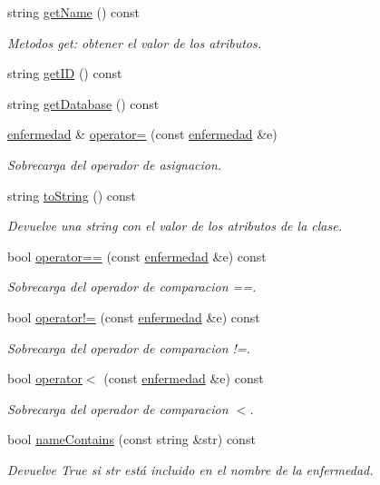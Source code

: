 \begin{DoxyCompactItemize}
\item 
string \hyperlink{classenfermedad_ab22f6f0140a5fe5a331d72920d95f55b}{get\-Name} () const 
\begin{DoxyCompactList}\small\item\em Metodos get\-: obtener el valor de los atributos. \end{DoxyCompactList}\item 
string \hyperlink{classenfermedad_aaf9b9135b1d4efda7dc61856fce1b7b2}{get\-I\-D} () const 
\item 
string \hyperlink{classenfermedad_a79d304a2e39ea391917744fd4d8f168d}{get\-Database} () const 
\item 
\hyperlink{classenfermedad}{enfermedad} \& \hyperlink{classenfermedad_a795be16b7e3e6a858211ff20a62c9d85}{operator=} (const \hyperlink{classenfermedad}{enfermedad} \&e)
\begin{DoxyCompactList}\small\item\em Sobrecarga del operador de asignacion. \end{DoxyCompactList}\item 
string \hyperlink{classenfermedad_a044425928b4f7fa6a398cf2486260b23}{to\-String} () const 
\begin{DoxyCompactList}\small\item\em Devuelve una string con el valor de los atributos de la clase. \end{DoxyCompactList}\item 
bool \hyperlink{classenfermedad_ac2786ad7be914729516dd15611532fbb}{operator==} (const \hyperlink{classenfermedad}{enfermedad} \&e) const 
\begin{DoxyCompactList}\small\item\em Sobrecarga del operador de comparacion ==. \end{DoxyCompactList}\item 
bool \hyperlink{classenfermedad_a85bf5cbb035fd4712ff9a72188060e5c}{operator!=} (const \hyperlink{classenfermedad}{enfermedad} \&e) const 
\begin{DoxyCompactList}\small\item\em Sobrecarga del operador de comparacion !=. \end{DoxyCompactList}\item 
bool \hyperlink{classenfermedad_a2b3361849fa17dc88be561cd4233d584}{operator$<$} (const \hyperlink{classenfermedad}{enfermedad} \&e) const 
\begin{DoxyCompactList}\small\item\em Sobrecarga del operador de comparacion $<$. \end{DoxyCompactList}\item 
bool \hyperlink{classenfermedad_a31f2b1bed5745d9f00f3e567c04e68af}{name\-Contains} (const string \&str) const 
\begin{DoxyCompactList}\small\item\em Devuelve True si str está incluido en el nombre de la enfermedad. \end{DoxyCompactList}\end{DoxyCompactItemize}
